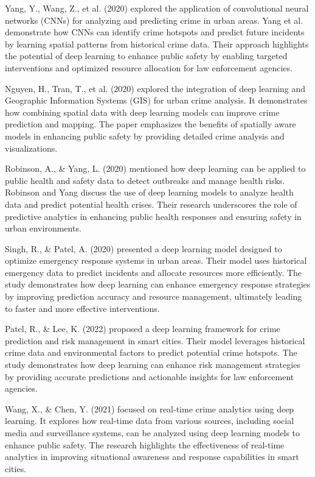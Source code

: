 \documentclass[conference]{IEEEtran}
\begin{document}
\cite{b4} Yang, Y., Wang, Z., et al. (2020) explored the application of convolutional neural networks (CNNs) for analyzing and predicting crime in urban areas. Yang et al. demonstrate how CNNs can identify crime hotspots and predict future incidents by learning spatial patterns from historical crime data. Their approach highlights the potential of deep learning to enhance public safety by enabling targeted interventions and optimized resource allocation for law enforcement agencies.

\cite{b5} Nguyen, H., Tran, T., et al. (2020) explored the integration of deep learning and Geographic Information Systems (GIS) for urban crime analysis. It demonstrates how combining spatial data with deep learning models can improve crime prediction and mapping. The paper emphasizes the benefits of spatially aware models in enhancing public safety by providing detailed crime analysis and visualizations.

\cite{b6} Robinson, A., & Yang, L. (2020) mentioned how deep learning can be applied to public health and safety data to detect outbreaks and manage health risks. Robinson and Yang discuss the use of deep learning models to analyze health data and predict potential health crises. Their research underscores the role of predictive analytics in enhancing public health responses and ensuring safety in urban environments.

\cite{b7} Singh, R., & Patel, A. (2020) presented a deep learning model designed to optimize emergency response systems in urban areas. Their model uses historical emergency data to predict incidents and allocate resources more efficiently. The study demonstrates how deep learning can enhance emergency response strategies by improving prediction accuracy and resource management, ultimately leading to faster and more effective interventions.

\cite{b8} Patel, R., & Lee, K. (2022) proposed a deep learning framework for crime prediction and risk management in smart cities. Their model leverages historical crime data and environmental factors to predict potential crime hotspots. The study demonstrates how deep learning can enhance risk management strategies by providing accurate predictions and actionable insights for law enforcement agencies.

\cite{b9} Wang, X., & Chen, Y. (2021) focused on real-time crime analytics using deep learning. It explores how real-time data from various sources, including social media and surveillance systems, can be analyzed using deep learning models to enhance public safety. The research highlights the effectiveness of real-time analytics in improving situational awareness and response capabilities in smart cities.
\end{document}
